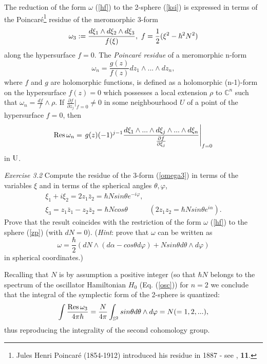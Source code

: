 \documentclass[12pt]{article}
\begin{document}
The reduction of the form $\omega$ (\ref{hf}) to the 2-sphere (\ref{ksi}) is expressed in terms of the 
Poincar\'e\footnote{Jules Henri Poincar\'e (1854-1912)
introduced his residue in 1887 - see \cite{Poincare}, {\bf 11}.} residue of the meromorphic 3-form
\begin{equation}
\label{omega3}
\omega_3:= \frac{d\xi_1\wedge d\xi_2\wedge d\xi_3}{f({\bf \xi})}, \, \,
f = \frac{1}{2}({\xi}^2 - \hbar^2 N^2)
\end{equation}
along the hypersurface $f=0$. The {\it Poincar\'e residue} of a meromorphic n-form
\begin{equation}
\label{omega/n}
\omega_n = \frac{g(z)}{f(z)} dz_1\wedge ...\wedge dz_n,
\end{equation}
where $f$ and $g$ are holomorphic functions, is defined as a holomorphic 
(n-1)-form on the hypersurface $f(z) = 0$ which possesses a local extension 
$\rho$ to ${\mathbb C}^n$ such that $\omega_n =\frac{df}{f}\wedge \rho$. If
$\frac{\partial f}{\partial z_j}|_{f=0} \neq 0$ in some neighbourhood $U$ of
a point of the hypersurface $f=0$, then
\begin{equation}
\label{Res}
{\rm Res} \, \omega_n = \left. g(z) (-1)^{j-1}\frac{d\xi_{1} \wedge ... \wedge d\xi_{j} \wedge ... \wedge d\xi_{n}}{\frac{\partial f}{\partial \xi_{j}}} \right| _{f=0} %
\end{equation}
in $\rm{U}$. 

{\it Exercise 3.2} Compute the residue of the 3-form (\ref{omega3}) in terms of the variables $\xi$ and in terms of the spherical angles $\theta, \varphi$,
\begin{eqnarray}
\xi_1 + i\xi_2 = 2 z_1 {\bar z}_2 = \hbar N sin\theta e^{-i\varphi}, &  \\  \nonumber
\xi_3 =z_1{\bar z}_1 - z_2 {\bar z}_2 = \hbar N cos\theta  \; \; \; \; \; \; \;  & (2z_1 z_2 = \hbar N sin\theta e^{i\alpha}) .  
\end{eqnarray}
Prove that the result coincides with the restriction of the form $\omega$ (\ref{hf}) to the sphere (\ref{zp}) (with $dN = 0$). ({\it Hint}: prove that $\omega$ can be written as 
\begin{equation}
\label{sph}
\omega = \frac{\hbar}{2} (dN\wedge (d\alpha -cos\theta d\varphi) + 
N sin\theta d\theta \wedge d\varphi) 
\end{equation}
in spherical coordinates.) 

Recalling that $N$ is by assumption a positive integer (so that $\hbar N$ belongs to the spectrum  
of the oscillator Hamiltonian $H_0$ (Eq. (\ref{osc})) for $n=2$ we conclude that the integral of 
the symplectic form of the 2-sphere is quantized:
\begin{equation}
\label{N}
\int \frac{{\rm Res} \, \omega_3}{4\pi\hbar} = \frac{N}{4\pi} \int_{{\mathbb S}^2} 
sin\theta d\theta \wedge d\varphi = N (= 1, 2, ...),
\end{equation}
thus reproducing the integrality of the second cohomology group.
\end{document}
